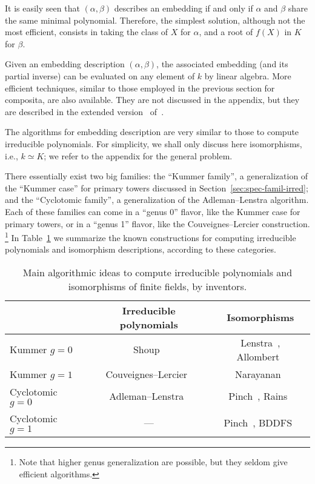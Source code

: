 \documentclass{report}
\theoremstyle{plain}
\theoremstyle{definition}
\begin{document}
It is easily seen that $(α,β)$ describes an embedding if and only if
$α$ and $β$ share the same minimal polynomial. %
Therefore, the simplest solution, although not the most efficient,
consists in taking the class of $X$ for $α$, and a root of $f(X)$ in
$K$ for $β$. %

Given an embedding description $(α,β)$, the associated embedding (and
its partial inverse) can be evaluated on any element of $k$ by linear
algebra. %
More efficient techniques, similar to those employed in the previous
section for composita, are also available. %
They are not discussed in the appendix, but they are described in the
extended version~\cite{ffisom-long} of~\cite{brieulle2018computing}. %

The algorithms for embedding description are very similar to those to
compute irreducible polynomials. %
For simplicity, we shall only discuss here isomorphisms, i.e.,
$k≃K$; we refer to the appendix for the general problem. %

There essentially exist two big families: the ``Kummer family'', a
generalization of the ``Kummer case'' for primary towers discussed in
Section~\ref{sec:spec-famil-irred}; and the ``Cyclotomic family'', a
generalization of the Adleman--Lenstra algorithm. %
Each of these families can come in a ``genus 0'' flavor, like the
Kummer case for primary towers, or in a ``genus 1'' flavor, like the
Couveignes--Lercier construction.%
\footnote{Note that higher genus generalization are possible, but they
  seldom give efficient algorithms.} %
In Table~\ref{tab:ffalgos} we summarize the known constructions for
computing irreducible polynomials and isomorphism descriptions,
according to these categories. %


\begin{table}
  \centering
  \begin{tabular}{l | c | c}
    & Irreducible polynomials
    & Isomorphisms\\
    \hline
    Kummer $g=0$
    & Shoup~\cite{Shoup_1990,shoup93,shoup94}
    & Lenstra~\cite{LenstraJr91},
      Allombert~\cite{Allombert02}\\
    Kummer $g=1$
    & Couveignes--Lercier~\cite{couveignes+lercier11}
    & Narayanan~\cite{narayanan2016fast}\\
    Cyclotomic $g=0$
    & Adleman--Lenstra~\cite{Adleman-Lenstra}
    & Pinch~\cite{Pinch}, Rains~\cite{rains2008}\\
    Cyclotomic $g=1$
    & ---
    & Pinch~\cite{Pinch}, BDDFS~\cite{brieulle2018computing}
  \end{tabular}
  \caption{Main algorithmic ideas to compute irreducible polynomials
    and isomorphisms of finite fields, by inventors.}
  \label{tab:ffalgos}
\end{table}
\end{document}
